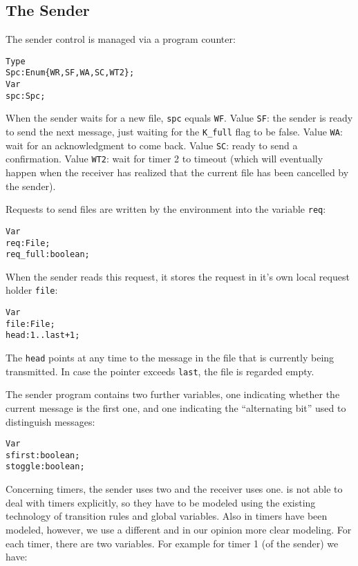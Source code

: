 \subsection{The Sender}

The sender control is managed via a program counter:

\begin{alltt}
  Type
    Spc  : Enum\{WR, SF, WA, SC, WT2\};
  Var
    spc : Spc;
\end{alltt}

When  the sender waits   for a new  file,  {\tt spc} equals {\tt  WF}.
Value  {\tt SF}: the sender  is ready to send  the  next message, just
waiting for the {\tt K\_full} flag to be  false.  Value {\tt WA}: wait
for an acknowledgment  to come back.  Value {\tt SC}:  ready to send a
confirmation. Value {\tt WT2}: wait for timer 2 to timeout (which will
eventually happen when the receiver has realized that the current file
has been cancelled by the sender).

Requests to send files are written by the environment into the variable
{\tt req}:

\begin{alltt}
  Var
    req : File;
    req_full : boolean;
\end{alltt}

When the sender reads this request, it stores the request in it's own
local request holder {\tt file}:

\begin{alltt}
  Var
    file : File;
    head : 1..last+1;
\end{alltt}

The {\tt head} points at any time to the  message in the file that
is currently being transmitted. In case the pointer exceeds {\tt last},
the file is regarded empty.

The sender  program  contains two  further  variables,  one indicating
whether the  current message is the  first one, and one indicating the
``alternating bit'' used to distinguish messages:

\begin{alltt}
  Var
    sfirst  : boolean;
    stoggle : boolean;
\end{alltt}

Concerning  timers,  the sender    uses   two and the   receiver  uses
one. \Murphi{}  is not  able to  deal with  timers explicitly, so they
have to  be modeled using the  existing technology of transition rules
and global variables. Also in \cite{HSV:Protocol.Coq} timers have been
modeled, however, we  use a different   and in our opinion  more clear
modeling. For each timer, there are  two variables. For example for
timer 1 (of the sender) we have:

